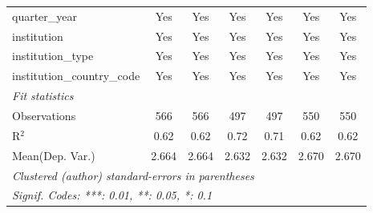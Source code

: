 \begin{tabular}{lcccccc}
   quarter\_year                      & Yes     & Yes       & Yes     & Yes     & Yes     & Yes\\  
   institution                        & Yes     & Yes       & Yes     & Yes     & Yes     & Yes\\  
   institution\_type                  & Yes     & Yes       & Yes     & Yes     & Yes     & Yes\\  
   institution\_country\_code         & Yes     & Yes       & Yes     & Yes     & Yes     & Yes\\  
   \midrule
   \emph{Fit statistics}\\
   Observations                       & 566     & 566       & 497     & 497     & 550     & 550\\  
   R$^2$                              & 0.62    & 0.62      & 0.72    & 0.71    & 0.62    & 0.62\\  
Mean(Dep. Var.) & 2.664 & 2.664 & 2.632 & 2.632 & 2.670 & 2.670 \\
   \midrule \midrule
   \multicolumn{7}{l}{\emph{Clustered (author) standard-errors in parentheses}}\\
   \multicolumn{7}{l}{\emph{Signif. Codes: ***: 0.01, **: 0.05, *: 0.1}}\\
\end{tabular}
\par\endgroup
